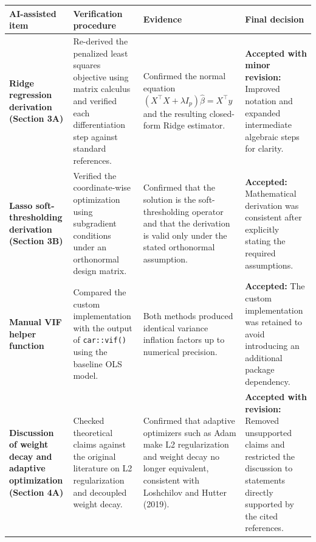 \documentclass[
  11pt,
]{article}
\newcounter{none} %
\begin{document}
{\def\LTcaptype{none} %
\begin{longtable}[]{@{}
  >{\raggedright\arraybackslash}p{}
  >{\raggedright\arraybackslash}p{}
  >{\raggedright\arraybackslash}p{}
  >{\raggedright\arraybackslash}p{}@{}}
\toprule\noalign{}
\begin{minipage}[b]{\linewidth}\raggedright
AI-assisted item
\end{minipage} & \begin{minipage}[b]{\linewidth}\raggedright
Verification procedure
\end{minipage} & \begin{minipage}[b]{\linewidth}\raggedright
Evidence
\end{minipage} & \begin{minipage}[b]{\linewidth}\raggedright
Final decision
\end{minipage} \\
\midrule\noalign{}
\endhead
\bottomrule\noalign{}
\endlastfoot
\textbf{Ridge regression derivation (Section 3A)} & Re-derived the
penalized least squares objective using matrix calculus and verified
each differentiation step against standard references. & Confirmed the
normal equation \((X^\top X + \lambda I_p)\hat{\beta} = X^\top y\) and
the resulting closed-form Ridge estimator. & \textbf{Accepted with minor
revision:} Improved notation and expanded intermediate algebraic steps
for clarity. \\
\textbf{Lasso soft-thresholding derivation (Section 3B)} & Verified the
coordinate-wise optimization using subgradient conditions under an
orthonormal design matrix. & Confirmed that the solution is the
soft-thresholding operator and that the derivation is valid only under
the stated orthonormal assumption. & \textbf{Accepted:} Mathematical
derivation was consistent after explicitly stating the required
assumptions. \\
\textbf{Manual VIF helper function} & Compared the custom implementation
with the output of \texttt{car::vif()} using the baseline OLS model. &
Both methods produced identical variance inflation factors up to
numerical precision. & \textbf{Accepted:} The custom implementation was
retained to avoid introducing an additional package dependency. \\
\textbf{Discussion of weight decay and adaptive optimization (Section
4A)} & Checked theoretical claims against the original literature on L2
regularization and decoupled weight decay. & Confirmed that adaptive
optimizers such as Adam make L2 regularization and weight decay no
longer equivalent, consistent with Loshchilov and Hutter (2019). &
\textbf{Accepted with revision:} Removed unsupported claims and
restricted the discussion to statements directly supported by the cited
references. \\
\end{longtable}
}
\end{document}
